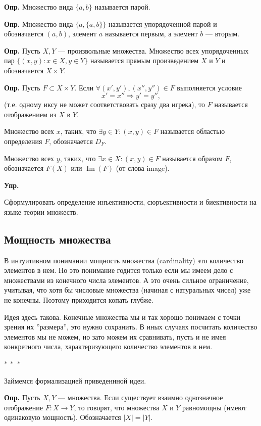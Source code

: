 \documentclass[a4paper,12pt]{article}
\newcommand{\threestars}{\begin{center}$ {\ast}\,{\ast}\,{\ast} $\end{center}}
\DeclareMathOperator{\Ima}{Im}
\newcounter{th-counter}
\newcounter{df-counter}
\newcounter{col-counter}
\newcommand{\df}{\par\noindent\textbf{Опр.} }
\newenvironment{exercise}{%
  \par\noindent\color{blue!70!black}\textbf{Упр.}%
}{\par}
\begin{document}
\df Множество вида $\{a,b\}$ называется парой.

\df Множество вида $\{a, \{a,b\}\}$ называется упорядоченной парой и обозначается $(a,b)$, элемент $a$ называется первым, а элемент $b$ --- вторым.

\df Пусть $X,Y$ --- произвольные множества. Множество всех упорядоченных пар $\{(x,y): x \in X, y \in Y\}$ называется прямым произведением $X$ и $Y$ и обозначается $X \times Y$.

\df Пусть $F \subset X \times Y$. Если $\forall (x', y'), (x'', y'') \in F$ выполняется условие \[x' = x'' \Rightarrow y' = y'',\]
(т.е. одному иксу не может соответствовать сразу два игрека), то $F$ называется отображением из $X$ в $Y$.

Множество всех $x$, таких, что $\exists y \in Y: (x,y) \in F$ называется областью определения $F$, обозначается $D_F$.

Множество всех $y$, таких, что $\exists x \in X : (x, y) \in F$ называется образом $F$, обозначается $F(X)$ или $\Ima (F)$ (от слова image).

\begin{exercise}
    Сформулировать определение инъективности, сюръективности и биективности на языке теории множеств.
\end{exercise}

\subsection*{Мощность множества}
В интуитивном понимании мощность множества (cardinality) это количество элементов в нем. Но это понимание годится только если мы имеем дело с множествами из конечного числа элементов. А это очень сильное ограничение, учитывая, что хотя бы числовые множества (начиная с натуральных чисел) уже не конечны. Поэтому приходится копать глубже.

Идея здесь такова. Конечные множества мы и так хорошо понимаем с точки зрения их ''размера'', это нужно сохранить. В иных случаях посчитать количество элементов мы не можем, но зато можем их сравнивать, пусть и не имея конкретного числа, характеризующего количество элементов в нем.

\threestars
Займемся формализацией приведеннной идеи.

\df Пусть $X, Y$ --- множества. Если существует взаимно однозначное отображение $F: X \rightarrow Y$, то говорят, что множества $X$ и $Y$ равномощны (имеют одинаковую мощность). Обозначается $|X| = |Y|$.
\end{document}
